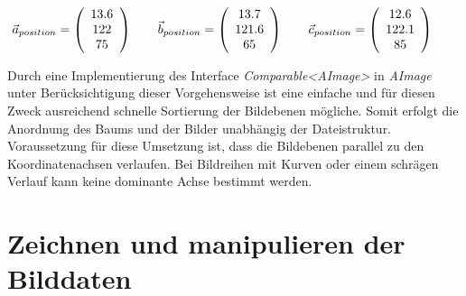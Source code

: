 \begin{equation}
\vec{a}_{position}=\left(\begin{array}{c} 13.6 \\ 122 \\ 75 \end{array}\right) \qquad
\vec{b}_{position}=\left(\begin{array}{c} 13.7 \\ 121.6 \\ 65 \end{array}\right) \qquad
\vec{c}_{position}=\left(\begin{array}{c} 12.6 \\ 122.1 \\ 85 \end{array}\right) \qquad
\vspace{0.5cm}
\label{example_sort}
\end{equation}

Durch eine Implementierung des Interface \textit{Comparable\textless AImage\textgreater} in \textit{AImage} unter Berücksichtigung dieser Vorgehensweise ist eine einfache und für diesen Zweck ausreichend schnelle Sortierung der Bildebenen mögliche. Somit erfolgt die Anordnung des Baums und der Bilder unabhängig der Dateistruktur.\\
Voraussetzung für diese Umsetzung ist, dass die Bildebenen parallel zu den Koordinatenachsen verlaufen. Bei Bildreihen mit Kurven oder einem schrägen Verlauf kann keine dominante Achse bestimmt werden.

\FloatBarrier
\section{Zeichnen und manipulieren der Bilddaten} \label{drawandmanipulate}

